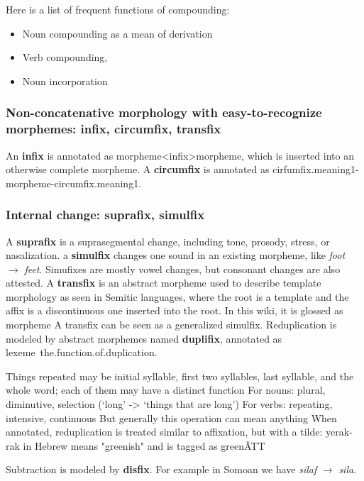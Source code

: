 \documentclass[UTF8, a4paper, oneside, scheme=plain]{ctexart}
\newcommand*{\concept}[1]{\textbf{#1}}
\newcommand*{\corpus}[1]{\emph{#1}}
\newcommand*{\translate}[1]{`#1'}
\begin{document}
Here is a list of frequent functions of compounding:
\begin{itemize}
    \item Noun compounding as a mean of derivation
    \item Verb compounding, 
    \item Noun incorporation
\end{itemize} 

\subsubsection{Non-concatenative morphology with easy-to-recognize morphemes: infix, circumfix, transfix}

An \concept{infix} is annotated as morpheme<infix>morpheme,
which is inserted into an otherwise complete morpheme.
A \concept{circumfix} is annotated as cirfumfix.meaning1-morpheme-circumfix.meaning1.


\subsubsection{Internal change: suprafix, simulfix}

A \concept{suprafix} is a suprasegmental change, including tone, prosody, stress, or nasalization.
a \concept{simulfix} changes one sound in an existing morpheme,
like \corpus{foot} $\to$ \corpus{feet}.
Simufixes are mostly vowel changes,
but consonant changes are also attested.
A \concept{transfix} is an abstract morpheme used to describe 
template morphology as seen in Semitic languages, 
where the root is a template and the affix is a discontinuous one inserted into the root. 
In this wiki, it is glossed as morpheme 
A transfix can be seen as a generalized simulfix.
Reduplication is modeled by abstract morphemes named \concept{duplifix},
annotated as lexeme~the.function.of.duplication.

Things repeated may be initial syllable, first two syllables, last syllable, and the whole word; each of them may have a distinct function
For nouns: plural, diminutive, selection (\translate{long} -> \translate{things that are long})
For verbs: repeating, intensive, continuous
But generally this operation can mean anything
When annotated, reduplication is treated similar to affixation, but with a tilde: yerak-rak in Hebrew means "greenish" and is tagged as green\~ATT

Subtraction is modeled by \concept{disfix}.
For example in Somoan we have \corpus{silaf} $\to$ \corpus{sila}.
\end{document}
